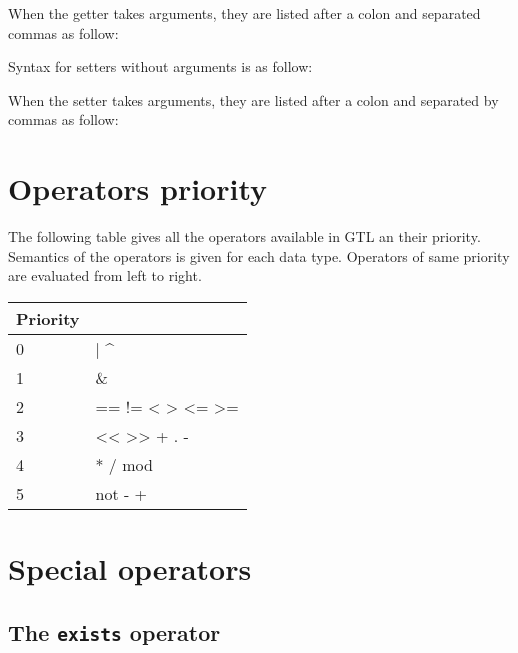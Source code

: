 \documentclass[10pt,openright,twosides]{report}
\begin{document}
When the getter takes arguments, they are listed after a colon and separated commas as follow:

\begin{gtl}
\end{gtl}

Syntax for setters without arguments is as follow:

\begin{gtl}
\end{gtl}

When the setter takes arguments, they are listed after a colon and separated by commas as follow:

\begin{gtl}
\end{gtl}

\section{Operators priority}

The following table gives all the operators available in GTL an their priority. Semantics of the operators is given for each data type. Operators of same priority are evaluated from left to right.

\begin{longtable}{l|>{\ttfamily}l}
{\bf Priority}&{\bf Operators}\\
\hline\endhead
 {0}&
  {| \^{}}\\
 {1}&
  {\&}\\
 {2}&
  {== != < > <= >=}\\
 {3}&
  {<< >> + . -}\\
 {4}&
  {* / mod}\\
 {5}&
  {not \raisebox{-1mm}{\textasciitilde} - +}\\
\end{longtable}

\section{Special operators}

\subsection{The \texttt{exists} operator}
\end{document}
